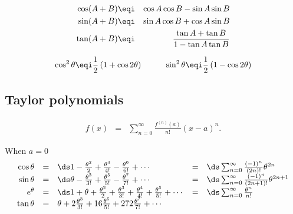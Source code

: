 \begin{eqnarray*}
   \cos(A+B)    &\eqi& \cos A \cos B - \sin A \sin B  \\
   \sin(A+B)    &\eqi& \sin A \cos B + \cos A \sin B  \\
   \tan(A+B)    &\eqi& \frac{\tan A + \tan B}{1 - \tan A \tan B} \\
\end{eqnarray*}

\[ \cos^2\theta \eqi \frac{1}{2} \left( 1 + \cos2\theta \right) \hspace{1cm}
   \sin^2\theta \eqi \frac{1}{2} \left( 1 - \cos2\theta \right) 
\]


\subsection*{Taylor polynomials}
\begin{eqnarray*}
   f(x) &=& \sum_{n=0}^\infty \frac{f^{(n)}(a)}{n!}(x-a)^n.
\end{eqnarray*}

When $a=0$ 
\[\begin{array}{rclcl}
   \cos\theta 
     &=& \ds 1 - \frac{\theta^2}{2} + \frac{\theta^4}{4!} - \frac{\theta^6}{6!} + \cdots 
     &=& \ds \sum_{n=0}^\infty \frac{(-1)^n}{(2n)!}\theta^{2n}
\\
   \sin\theta 
     &=& \ds \theta - \frac{\theta^3}{3!} + \frac{\theta^5}{5!} - \frac{\theta^7}{7!} + \cdots 
     &=& \ds \sum_{n=0}^\infty \frac{(-1)^n}{(2n+1)!}\theta^{2n+1}
\\
   e^\theta
     &=& \ds 1 + \theta + \frac{\theta^2}{2} + \frac{\theta^3}{3!} + \frac{\theta^4}{4!} + \frac{\theta^5}{5!} + \cdots
     &=& \ds \sum_{n=0}^\infty \frac{\theta^n}{n!}
\\
   \tan\theta 
     &=& \theta + 2\frac{\theta^3}{3!} + 16\frac{\theta^5}{5!} + 272\frac{\theta^7}{7!} + \cdots \\
\end{array}\]

